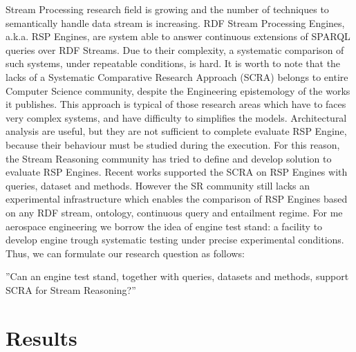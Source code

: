 Stream Processing research field is growing and the number of techniques to semantically handle data stream is increasing. RDF Stream Processing Engines, a.k.a. RSP Engines, are system able to answer continuous extensions of SPARQL queries over RDF Streams. Due to their complexity, a systematic comparison of such systems, under repeatable conditions, is hard. It is worth to note that the lacks of a Systematic Comparative Research Approach (SCRA) belongs to entire Computer Science community, despite the Engineering epistemology of the works it publishes. This approach is typical of those research areas which have to faces very complex systems, and have difficulty to simplifies the models. Architectural analysis are useful, but they are not sufficient to complete evaluate RSP Engine, because their behaviour must be studied during the execution. For this reason, the Stream Reasoning community has tried to define and develop solution to evaluate RSP Engines. Recent works supported the SCRA on RSP Engines with queries, dataset and methods. However the SR community still lacks an experimental infrastructure which enables the comparison of RSP Engines based on any RDF stream, ontology, continuous query and entailment regime.  For me aerospace engineering we borrow the idea of engine test stand: a facility to develop engine trough systematic testing under precise experimental conditions. Thus, we can formulate our research question as follows:

”Can an engine test stand, together with queries, datasets and methods, support SCRA for Stream Reasoning?”

\section{Results}


